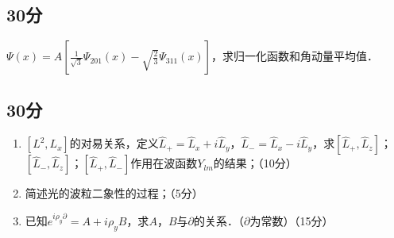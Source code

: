 
\subsection{30分}
$\varPsi (x)=A[\frac{1}{\sqrt{3}}\varPsi_{201}(x)-\sqrt{\frac{2}{3}}\varPsi_{311}(x)]$，求归一化函数和角动量平均值．
\subsection{30分}
\begin{enumerate}
\item $[L^{2},L_{x}]$的对易关系，定义$\hat{L}_{+}=\hat{L}_{x}+i\hat{L}_{y}$，$\hat{L}_{-}=\hat{L}_{x}-i\hat{L}_{y}$，求$[\hat{L}_{+},\hat{L}_{z}]$；$[\hat{L}_{-},\hat{L}_{z}]$；$[\hat{L}_{+},\hat{L}_{-}]$作用在波函数$Y_{lm}$的结果；（10分）
\item 简述光的波粒二象性的过程；（5分）
\item 已知$e^{i\rho_{y}\partial}=A+i\rho_{y}B$，求$A$，$B$与$\partial$的关系．（$\partial$为常数）（15分）
\end{enumerate}